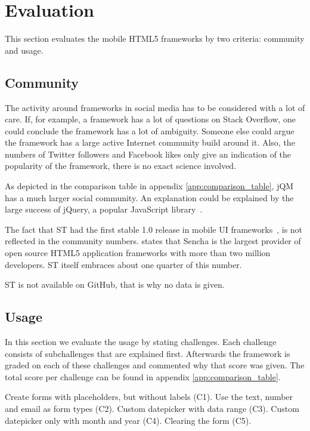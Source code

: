 \documentclass[a4paper]{artikel3}
\newcommand{\setspace}[0]{\vspace{2mm}}
\renewcommand{\paragraph}[1]{\setspace \noindent {\bf #1}  }
\newcommand{\challenge}[1]{\paragraph{#1}}
\begin{document}
\section{Evaluation}
This section evaluates the mobile HTML5 frameworks by two criteria: community and usage.

\subsection{Community} %
\label{sec:community}

The activity around frameworks in social media has to be considered with a lot of care.  
If,  for example,  a framework has a lot of questions on Stack Overflow,  one could conclude the framework has a lot of ambiguity.  
Someone else could argue  the framework has a large active Internet community build around it.  
Also,  the numbers of Twitter followers and Facebook likes only give an indication of the popularity of the framework,  there is no exact science involved.

As depicted in the comparison table in appendix \ref{app:comparison_table},  jQM has a much larger social community.  
An explanation could be explained by the large success of jQuery,  a popular JavaScript library~\cite{Hales2012}.

The fact that ST had the first stable 1.0 release in mobile UI frameworks~\cite{Oeflman2011},  is not reflected in the community numbers.  
\cite{Inc.} states that Sencha is the largest provider of open source HTML5 application frameworks with more than two million developers.  
ST itself embraces about one quarter of this number.

ST is not available on GitHub,  that is why no data is given.

\subsection{Usage}
\label{sec:poc}
In this section we evaluate the usage by stating challenges.
Each challenge consists of subchallenges that are explained first.
Afterwards the framework is graded on each of these challenges and commented why that score was given.
The total score per challenge can be found in appendix \ref{app:comparison_table}.

\challenge{Forms (C1,C2,C3,C4,C5)}
Create forms with placeholders, but without labels (C1).
Use the text, number and email as form types (C2).
Custom datepicker with data range (C3).
Custom datepicker only with month and year (C4).
Clearing the form (C5).
\end{document}
